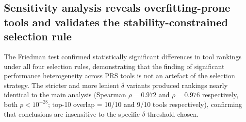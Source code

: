 \documentclass[pdflatex,sn-basic]{sn-jnl}
\begin{document}

\subsection*{Sensitivity analysis reveals overfitting-prone tools and validates the stability-constrained selection rule} 

The Friedman test confirmed statistically significant differences in tool rankings under all four selection rules, demonstrating that the finding of significant performance heterogeneity across PRS tools is not an artefact of the selection strategy. The stricter and more lenient $\delta$ variants produced rankings nearly identical to the main analysis (Spearman $\rho = 0.972$ and $\rho = 0.976$ respectively, both $p < 10^{-28}$; top-10 overlap = 10/10 and 9/10 tools respectively), confirming that conclusions are insensitive to the specific $\delta$ threshold chosen. 
\end{document}
